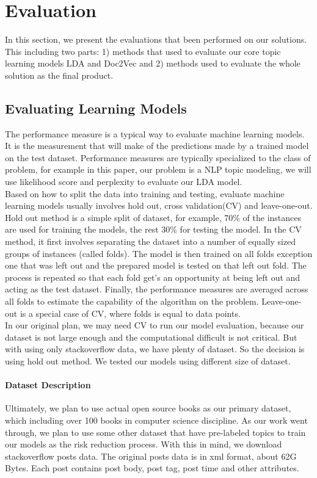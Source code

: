 
\section{Evaluation}
In this section, we present the evaluations that been performed on our solutions. This including two parts: 1) methods that used to evaluate our core topic learning models LDA and Doc2Vec and 2) methods used to evaluate the whole solution as the final product. 
\subsection{Evaluating Learning Models}
The performance measure is a typical way to evaluate machine learning models. It is the measurement that will make of the predictions made by a trained model on the test dataset. Performance measures are typically specialized to the class of problem, for example in this paper, our problem is a NLP topic modeling, we will use likelihood score and perplexity to evaluate our LDA model.\\
Based on how to split the data into training and testing, evaluate machine learning models usually involves hold out, cross validation(CV) and leave-one-out. \\
Hold out method is a simple split of dataset, for example, 70\% of the instances are used for training the models, the rest 30\% for testing the model. In the CV method, it first involves separating the dataset into a number of equally sized groups of instances (called folds). The model is then trained on all folds exception one that was left out and the prepared model is tested on that left out fold. The process is repeated so that each fold get's an opportunity at being left out and acting as the test dataset. Finally, the performance measures are averaged across all folds to estimate the capability of the algorithm on the problem.  Leave-one-out is a special case of CV, where folds is equal to data points.\\
In our original plan, we may need CV to run our model evaluation, because our dataset is not large enough and the computational difficult is not critical. But with using only stackoverflow data, we have plenty of dataset. So the decision is using hold out method. We tested our models using different size of dataset. 
\paragraph{Dataset Description} 
Ultimately, we plan to use actual open source books as our primary dataset, which including over 100 books in computer science discipline. As our work went through, we plan to use some other dataset that have pre-labeled topics to train our models as the risk reduction process. With this in mind, we download stackoverflow posts data. The original posts data is in xml format, about 62G Bytes. Each post contains post body, post tag, post time and other attributes.
